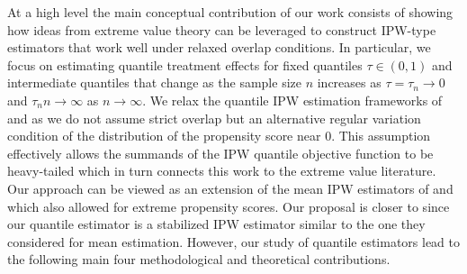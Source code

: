 \documentclass[12pt]{amsart}
\newcommand{\1}{\mathbbm{1}}
\newcommand{\0}{\mathbf{0}}
\theoremstyle{plain}
\theoremstyle{definition}
\begin{document}
At a high level the main conceptual contribution of our work consists of showing how ideas from extreme value theory can be leveraged to  construct  IPW-type estimators that work well under relaxed overlap conditions.  In particular, we focus on estimating quantile treatment effects for fixed quantiles $\tau\in(0,1)$ and intermediate quantiles that change as the sample size $n$ increases as $\tau=\tau_n\to 0$ and  $\tau_nn\to\infty$ as $n\to \infty$. We relax the quantile IPW estimation frameworks of \cite{firpo2007} and \cite{zhang2018} as we do not assume strict overlap but an alternative regular variation condition of the distribution of the propensity score near $0$. This assumption effectively allows the summands of the IPW quantile objective function to be heavy-tailed which in turn connects this work to the extreme value literature. Our approach can be viewed as an extension of the mean IPW estimators of \cite{ma:wang2020} and \cite{heiler:kazak2021} which also allowed for extreme propensity scores. Our proposal is closer to \cite{heiler:kazak2021} since our quantile estimator is a stabilized IPW estimator similar to the one they considered for mean estimation. However, our study of quantile  estimators lead to the following main  four methodological and theoretical contributions.
\end{document}
